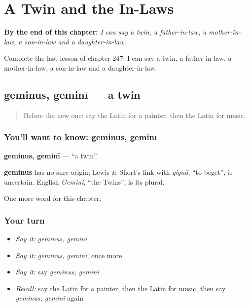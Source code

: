 
\chapter{A Twin and the In-Laws}
\label{ch:la-twin-father-in-law-mother-in-law-son-in-law-daughter-in-law}

\begin{chapteropening}
\textbf{By the end of this chapter:} \emph{I can say a twin, a father-in-law, a mother-in-law, a son-in-law and a daughter-in-law.}

Complete the last lesson of chapter 247: I can say a twin, a father-in-law, a mother-in-law, a son-in-law and a daughter-in-law.
\end{chapteropening}

\section[geminus, geminī]{geminus, geminī — a twin}

\label{lesson:LA-C247-geminus}



\begin{quote}
Before the new one: say the Latin for a painter, then the Latin for music.
\end{quote}

\subsection*{You'll want to know: geminus, geminī}
\textbf{geminus, geminī} — \textquotedblleft{}a twin\textquotedblright{}.

\begin{cousinweb}
\textbf{geminus} has no sure origin; Lewis \& Short's link with \emph{gignō}, \textquotedblleft{}to beget\textquotedblright{}, is uncertain. English \emph{Gemini}, \textquotedblleft{}the Twins\textquotedblright{}, is its plural.
\end{cousinweb}

\begin{grammarlens}[title={What you've built}]
One more word for this chapter.
\end{grammarlens}

\subsection*{Your turn}
\begin{itemize}
\raggedright
  \item \emph{Say it:} \emph{geminus, geminī}
  \item \emph{Say it:} \emph{geminus, geminī}, once more
  \item \emph{Say it:} say \emph{geminus, geminī}
  \item \emph{Recall:} say the Latin for a painter, then the Latin for music, then say \emph{geminus, geminī} again
\end{itemize}

